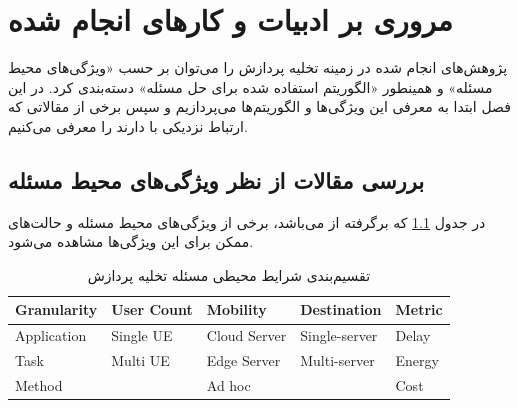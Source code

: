 \chapter{مروری بر ادبیات و کارهای انجام شده}
پژوهش‌های انجام شده در زمینه تخلیه پردازش را می‌توان بر حسب «ویژگی‌های محیط مسئله» و همینطور «الگوریتم استفاده شده برای حل مسئله» دسته‌بندی کرد. در این فصل ابتدا به معرفی این ویژگی‌ها و الگوریتم‌ها می‌پردازیم و سپس برخی از مقالاتی که ارتباط نزدیکی با \CurrentProject دارند را معرفی می‌کنیم.

\section[ویژگی‌های محیط مسئله]{بررسی مقالات از نظر ویژگی‌های محیط مسئله} 
در جدول \ref{table:mohit} که برگرفته از \cite{wang2019} می‌باشد، برخی از ویژگی‌های محیط مسئله و حالت‌های ممکن برای این ویژگی‌ها مشاهده می‌شود.
\begin{table}[H]
	\centering
	\begin{latin}

\begin{tabular}{@{}lllll@{}}
	\toprule
	\textbf{Granularity} & \textbf{User Count} & \textbf{Mobility} & \textbf{Destination} & \textbf{Metric} \\ \midrule
	Application          & Single UE             & Cloud Server      & Single-server        & Delay           \\
	Task                 & Multi UE   & Edge Server       & Multi-server         & Energy          \\
	Method               &             & Ad hoc            &                      & Cost            \\ \bottomrule
\end{tabular}
	\end{latin}
	\caption{تقسیم‌بندی شرایط محیطی مسئله تخلیه پردازش}
	\label{table:mohit}
\end{table}

